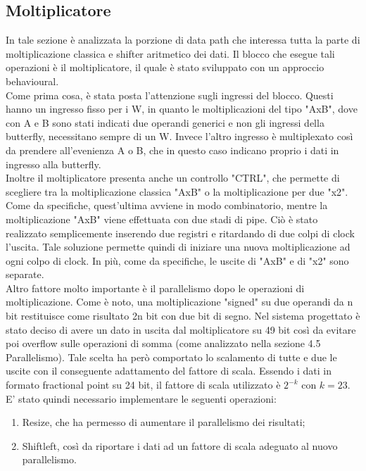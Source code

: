 \documentclass[a4paper, titlepage]{article}
\begin{document}
\subsection{Moltiplicatore}%
In tale sezione è analizzata la porzione di data path che interessa tutta la parte di moltiplicazione classica e shifter aritmetico dei dati. Il blocco che esegue tali operazioni è il moltiplicatore, il quale è stato sviluppato con un approccio behavioural.\\
Come prima cosa, è stata posta l'attenzione sugli ingressi del blocco. Questi hanno un ingresso fisso per i W, in quanto le moltiplicazioni del tipo "AxB", dove con A e B sono stati indicati due operandi generici e non gli ingressi della butterfly, necessitano sempre di un W. Invece l'altro ingresso è multiplexato così da prendere all'evenienza A o B, che in questo caso indicano proprio i dati in ingresso alla butterfly.\\Inoltre il moltiplicatore presenta anche un controllo "CTRL", che permette di scegliere tra la moltiplicazione classica "AxB" o la moltiplicazione per due "x2". Come da specifiche, quest'ultima avviene in modo combinatorio, mentre la moltiplicazione "AxB" viene effettuata con due stadi di pipe. Ciò è stato realizzato semplicemente inserendo due registri e ritardando di due colpi di clock l'uscita. Tale soluzione permette quindi di iniziare una nuova moltiplicazione ad ogni colpo di clock. In più, come da specifiche, le uscite di "AxB" e di "x2" sono separate. \\
Altro fattore molto importante è il parallelismo dopo le operazioni di moltiplicazione. Come è noto, una moltiplicazione "signed" su due operandi da n bit restituisce come risultato 2n bit con due bit di segno. Nel sistema progettato è stato deciso di avere un dato in uscita dal moltiplicatore su 49 bit così da evitare poi overflow sulle operazioni di somma (come analizzato nella sezione 4.5 Parallelismo). Tale scelta ha però comportato lo scalamento di tutte e due le uscite con il conseguente adattamento del fattore di scala. Essendo i dati in formato fractional point su 24 bit, il fattore di scala utilizzato è $2^{-k}$ con $k=23$. E' stato quindi necessario implementare le seguenti operazioni:
\begin{enumerate}
    \item Resize, che ha permesso di aumentare il parallelismo dei risultati;
    \item Shift\textunderscore left, così da riportare i dati ad un fattore di scala adeguato al nuovo parallelismo.
\end{enumerate}
\end{document}
